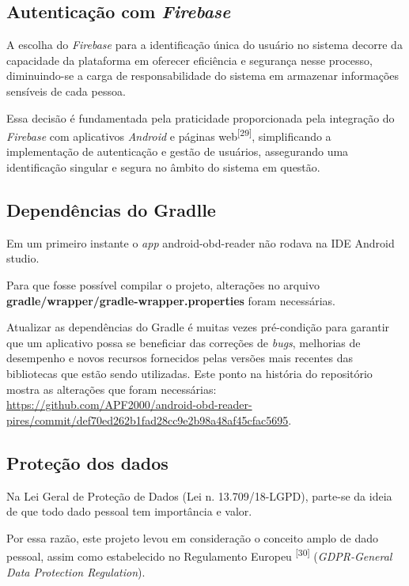     \subsection{Autenticação com \textit{Firebase}}

    A  escolha do \textit{Firebase} para a identificação única do usuário no sistema decorre da capacidade da plataforma em oferecer eficiência e segurança nesse processo, diminuindo-se a carga de responsabilidade do sistema em armazenar informações sensíveis de cada pessoa. 
    
    Essa decisão é fundamentada pela praticidade proporcionada pela integração do \textit{Firebase} com aplicativos \textit{Android} e páginas web\textsuperscript{[29]}, simplificando a implementação de autenticação e gestão de usuários, assegurando uma identificação singular e segura no âmbito do sistema em questão.

    \subsection{Dependências do Gradlle}

    Em um primeiro instante o \textit{app} android-obd-reader não rodava na IDE Android studio. 
    
    Para que fosse possível compilar o projeto, alterações no arquivo \textbf{gradle/wrapper/gradle-wrapper.properties} foram necessárias. 
    
    Atualizar as dependências do Gradle  é muitas vezes pré-condição para garantir que um aplicativo possa se beneficiar das correções de \textit{bugs}, melhorias de desempenho e novos recursos fornecidos pelas versões mais recentes das bibliotecas que estão sendo utilizadas. Este ponto na história do repositório mostra as alterações que foram necessárias: \url{https://github.com/APF2000/android-obd-reader-pires/commit/def70ed262b1fad28cc9e2b98a48af45cfac5695}.

    \subsection{Proteção dos dados}
    
    Na Lei Geral de Proteção de Dados (Lei n. 13.709/18-LGPD), parte-se da ideia de que todo dado pessoal tem importância e valor. 
    
    Por essa razão, este projeto levou em consideração o conceito amplo de dado pessoal, assim como estabelecido no Regulamento Europeu \textsuperscript{[30]} (\textit{GDPR-General Data Protection  Regulation}). 
    
